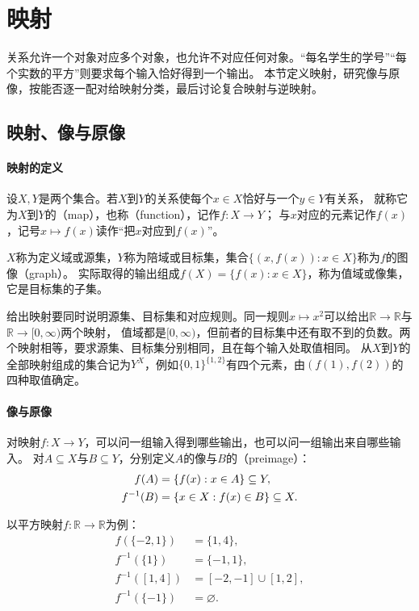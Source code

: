 \section{映射}
\label{sec:prelim-functions-value-ranges}

关系允许一个对象对应多个对象，也允许不对应任何对象。“每名学生的学号”“每个实数的平方”则要求每个输入恰好得到一个输出。
本节定义映射，研究像与原像，按能否逐一配对给映射分类，最后讨论复合映射与逆映射。

\subsection{映射、像与原像}
\label{sec:prelim-function-definition}

\paragraph{映射的定义}
设$X,Y$是两个集合。若$X$到$Y$的关系使每个$x\in X$恰好与一个$y\in Y$有关系，
就称它为$X$到$Y$的（map），也称（function），记作$f:X\to Y$；
与$x$对应的元素记作$f(x)$，记号$x\mapsto f(x)$读作“把$x$对应到$f(x)$”。

$X$称为定义域或源集，$Y$称为陪域或目标集，集合$\{(x,f(x)):x\in X\}$称为$f$的图像（graph）。
实际取得的输出组成$f(X)=\{f(x):x\in X\}$，称为值域或像集，它是目标集的子集。

给出映射要同时说明源集、目标集和对应规则。同一规则$x\mapsto x^2$可以给出$\mathbb R\to\mathbb R$与$\mathbb R\to[0,\infty)$两个映射，
值域都是$[0,\infty)$，但前者的目标集中还有取不到的负数。两个映射相等，要求源集、目标集分别相同，且在每个输入处取值相同。
从$X$到$Y$的全部映射组成的集合记为$Y^X$，例如$\{0,1\}^{\{1,2\}}$有四个元素，由$(f(1),f(2))$的四种取值确定。

\paragraph{像与原像}
对映射$f:X\to Y$，可以问一组输入得到哪些输出，也可以问一组输出来自哪些输入。
对$A\subseteq X$与$B\subseteq Y$，分别定义$A$的像与$B$的（preimage）：
\begin{align}
 f(A)&=\{f(x):x\in A\}\subseteq Y,\notag\\
 f^{-1}(B)&=\{x\in X:f(x)\in B\}\subseteq X.
 \label{eq:prelim-preimage}
\end{align}

以平方映射$f:\mathbb R\to\mathbb R$为例：
\begin{align*}
 f(\{-2,1\})&=\{1,4\},\\
 f^{-1}(\{1\})&=\{-1,1\},\\
 f^{-1}([1,4])&=[-2,-1]\cup[1,2],\\
 f^{-1}(\{-1\})&=\varnothing.
\end{align*}

